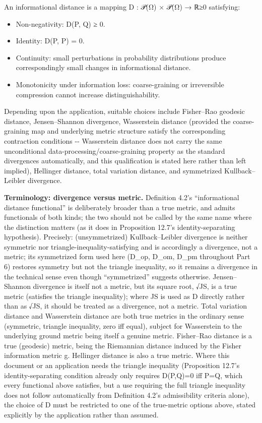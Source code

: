 \documentclass[
]{article}
\begin{document}
An informational distance is a mapping D : 𝒫(Ω) × 𝒫(Ω) → ℝ≥0 satisfying:

\begin{itemize}
\item
  Non-negativity: D(P, Q) ≥ 0.
\item
  Identity: D(P, P) = 0.
\item
  Continuity: small perturbations in probability distributions produce
  correspondingly small changes in informational distance.
\item
  Monotonicity under information loss: coarse-graining or irreversible
  compression cannot increase distinguishability.
\end{itemize}

Depending upon the application, suitable choices include Fisher--Rao
geodesic distance, Jensen--Shannon divergence, Wasserstein distance
(provided the coarse-graining map and underlying metric structure
satisfy the corresponding contraction conditions -\/- Wasserstein
distance does not carry the same unconditional
data-processing/coarse-graining property as the standard divergences
automatically, and this qualification is stated here rather than left
implied), Hellinger distance, total variation distance, and symmetrized
Kullback--Leibler divergence.

\textbf{Terminology: divergence versus metric.} Definition 4.2's
``informational distance functional'' is deliberately broader than a
true metric, and admits functionals of both kinds; the two should not be
called by the same name where the distinction matters (as it does in
Proposition 12.7's identity-separating hypothesis). Precisely:
(unsymmetrized) Kullback--Leibler divergence is neither symmetric nor
triangle-inequality-satisfying and is accordingly a divergence, not a
metric; its symmetrized form used here (D\_op, D\_om, D\_pm throughout
Part 6) restores symmetry but not the triangle inequality, so it remains
a divergence in the technical sense even though ``symmetrized'' suggests
otherwise. Jensen--Shannon divergence is itself not a metric, but its
square root, √JS, is a true metric (satisfies the triangle inequality);
where JS is used as D directly rather than as √JS, it should be treated
as a divergence, not a metric. Total variation distance and Wasserstein
distance are both true metrics in the ordinary sense (symmetric,
triangle inequality, zero iff equal), subject for Wasserstein to the
underlying ground metric being itself a genuine metric. Fisher--Rao
distance is a true (geodesic) metric, being the Riemannian distance
induced by the Fisher information metric g. Hellinger distance is also a
true metric. Where this document or an application needs the triangle
inequality (Proposition 12.7's identity-separating condition already
only requires D(P,Q)=0 iff P=Q, which every functional above satisfies,
but a use requiring the full triangle inequality does not follow
automatically from Definition 4.2's admissibility criteria alone), the
choice of D must be restricted to one of the true-metric options above,
stated explicitly by the application rather than assumed.
\end{document}
